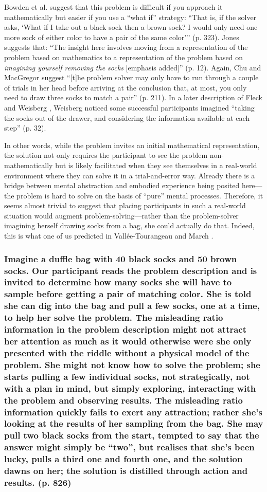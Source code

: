 \documentclass{article}
\begin{document}
Bowden et al. \parencite[323][undefined]{Bowden2005} suggest that this problem is difficult if you approach it mathematically but easier if you use a “what if” strategy: “That is, if the solver asks, ‘What if I take out a black sock then a brown sock? I would only need one more sock of either color to have a pair of the same color'” (p. 323). Jones \parencite[12][undefined]{Jones2003} suggests that: “The insight here involves moving from a representation of the problem based on mathematics to a representation of the problem based on \emph{imagining yourself removing the socks }[emphasis added]” (p. 12). Again, Chu and MacGregor \parencite[211][undefined]{Chu2011} suggest “[t]he problem solver may only have to run through a couple of trials in her head before arriving at the conclusion that, at most, you only need to draw three socks to match a pair” (p. 211). In a later description of Fleck and Weisberg \parencite{Fleck2013}, Weisberg \parencite[32][undefined]{Weisberg2015} noticed some successful participants imagined “taking the socks out of the drawer, and considering the information available at each step” (p. 32).

In other words, while the problem invites an initial mathematical representation, the solution not only requires the participant to see the problem non-mathematically but is likely facilitated when they see themselves in a real-world environment where they can solve it in a trial-and-error way. Already there is a bridge between mental abstraction and embodied experience being posited here—the problem is hard to solve on the basis of “pure” mental processes. Therefore, it seems almost trivial to suggest that placing participants in such a real-world situation would augment problem-solving—rather than the problem-solver imagining herself drawing socks from a bag, she could actually do that. Indeed, this is what one of us predicted in Vallée-Tourangeau and March \parencite[3][undefined]{Vallée-Tourangeau2019}. 

\subsubsection{Imagine a duffle bag with 40 black socks and 50 brown socks. Our participant reads the problem description and is invited to determine how many socks she will have to sample before getting a pair of matching color. She is told she can dig into the bag and pull a few socks, one at a time, to help her solve the problem. The misleading ratio information in the problem description might not attract her attention as much as it would otherwise were she only presented with the riddle without a physical model of the problem. She might not know how to solve the problem; she starts pulling a few individual socks, not strategically, not with a plan in mind, but simply exploring, interacting with the problem and observing results. The misleading ratio information quickly fails to exert any attraction; rather she's looking at the results of her sampling from the bag. She may pull two black socks from the start, tempted to say that the answer might simply be “two”, but realises that she's been lucky, pulls a third one and fourth one, and the solution dawns on her; the solution is distilled through action and results. (p. 826)}
\end{document}
